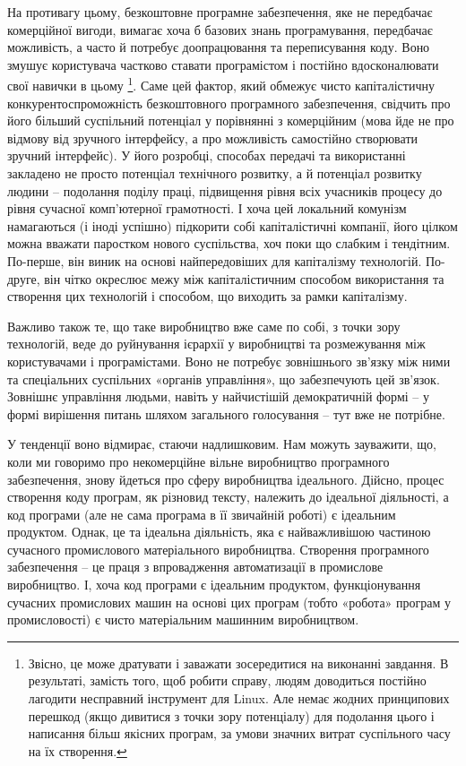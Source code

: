 \documentclass[12pt,a4paper,openany]{book}
\begin{document}
На противагу цьому, безкоштовне програмне забезпечення, яке не передбачає комерційної вигоди, вимагає хоча б базових знань програмування, передбачає можливість, а часто й потребує доопрацювання та переписування коду. Воно змушує користувача частково ставати програмістом і постійно вдосконалювати свої навички в цьому \footnote{Звісно, це може дратувати і заважати зосередитися на виконанні завдання. В результаті, замість того, щоб робити справу, людям доводиться постійно лагодити несправний інструмент для Linux. Але немає жодних принципових перешкод (якщо дивитися з точки зору потенціалу) для подолання цього і написання більш якісних програм, за умови значних витрат суспільного часу на їх створення.}. Саме цей фактор, який обмежує чисто капіталістичну конкурентоспроможність безкоштовного програмного забезпечення, свідчить про його більший суспільний потенціал у порівнянні з комерційним (мова йде не про відмову від зручного інтерфейсу, а про можливість самостійно створювати зручний інтерфейс). У його розробці, способах передачі та використанні закладено не просто потенціал технічного розвитку, а й потенціал розвитку людини – подолання поділу праці, підвищення рівня всіх учасників процесу до рівня сучасної комп’ютерної грамотності. І хоча цей локальний комунізм намагаються (і іноді успішно) підкорити собі капіталістичні компанії, його цілком можна вважати паростком нового суспільства, хоч поки що слабким і тендітним. По-перше, він виник на основі найпередовіших для капіталізму технологій. По-друге, він чітко окреслює межу між капіталістичним способом використання та створення цих технологій і способом, що виходить за рамки капіталізму.

Важливо також те, що таке виробництво вже саме по собі, з точки зору технологій, веде до руйнування ієрархії у виробництві та розмежування між користувачами і програмістами. Воно не потребує зовнішнього зв’язку між ними та спеціальних суспільних «органів управління», що забезпечують цей зв’язок. Зовнішнє управління людьми, навіть у найчистішій демократичній формі – у формі вирішення питань шляхом загального голосування – тут вже не потрібне.

У тенденції воно відмирає, стаючи надлишковим. Нам можуть зауважити, що, коли ми говоримо про некомерційне вільне виробництво програмного забезпечення, знову йдеться про сферу виробництва ідеального. Дійсно, процес створення коду програм, як різновид тексту, належить до ідеальної діяльності, а код програми (але не сама програма в її звичайній роботі) є ідеальним продуктом. Однак, це та ідеальна діяльність, яка є найважливішою частиною сучасного промислового матеріального виробництва. Створення програмного забезпечення – це праця з впровадження автоматизації в промислове виробництво. І, хоча код програми є ідеальним продуктом, функціонування сучасних промислових машин на основі цих програм (тобто «робота» програм у промисловості) є чисто матеріальним машинним виробництвом.
\end{document}

